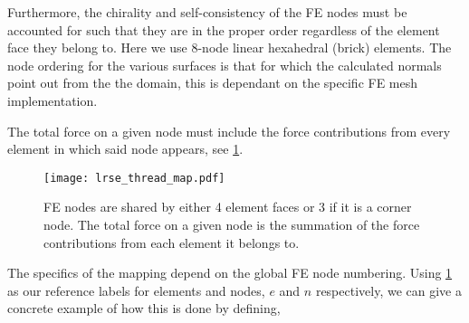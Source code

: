 Furthermore, the chirality and self-consistency of the FE nodes must be accounted for such that they are in the proper order regardless of the element face they belong to. Here we use 8-node linear hexahedral (brick) elements. The node ordering for the various surfaces is that for which the calculated normals point out from the the domain, this is dependant on the specific FE mesh implementation.

The total force on a given node must include the force contributions from every element in which said node appears, see \cref{f:shared_node}.
\begin{figure}
    \centering
    \texttt{[image: lrse\_thread\_map.pdf]}
    \caption[FE nodes are shared between surface elements.]{FE nodes are shared by either 4 element faces or 3 if it is a corner node. The total force on a given node is the summation of the force contributions from each element it belongs to.}
    \label{f:shared_node}
\end{figure}
The specifics of the mapping depend on the global FE node numbering. Using \cref{f:shared_node} as our reference labels for elements and nodes, $e$ and $n$ respectively, we can give a concrete example of how this is done by defining,
